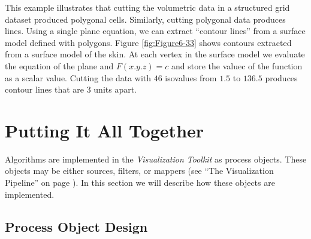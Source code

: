 This example illustrates that cutting the volumetric data in a structured grid dataset produced polygonal cells. Similarly, cutting polygonal data produces lines. Using a single plane equation, we can extract ``contour lines'' from a surface model defined with polygons. Figure \ref{fig:Figure6-33} shows contours extracted from a surface model of the skin. At each vertex in the surface model we evaluate the equation of the plane and $F(x.y.z) = c$ and store the valuec of the function as a scalar value. Cutting the data with $46$ isovalues from $1.5$ to $136.5$ produces contour lines that are $3$ units apart.

\section{Putting It All Together}

Algorithms are implemented in the \emph{Visualization Toolkit} as process objects. These objects may be either sources, filters, or mappers (see ``The Visualization Pipeline'' on page \pageref{sec:visualization_pipeline} ). In this section we will describe how these objects are implemented.

\subsection{Process Object Design}

